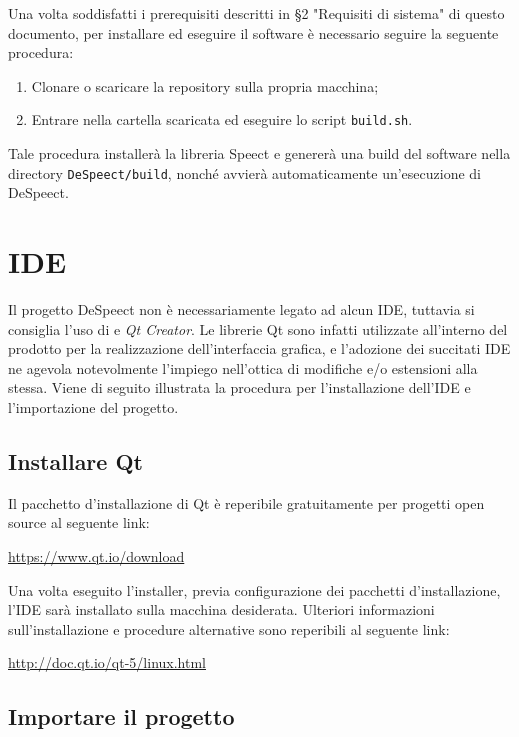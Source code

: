 \documentclass[openany,12pt,a4paper]{report}
\begin{document}
	\noindent Una volta soddisfatti i prerequisiti descritti in §2 "Requisiti di sistema" di questo documento, per installare ed eseguire il software è necessario seguire la seguente procedura:
	\begin{enumerate}
		\item Clonare o scaricare la repository sulla propria macchina;
		\item Entrare nella cartella scaricata ed eseguire lo script \verb|build.sh|.
	\end{enumerate}
	Tale procedura installerà la libreria Speect e genererà una build del software nella directory \verb|DeSpeect/build|, nonché avvierà automaticamente un'esecuzione di DeSpeect.
	
	\section{IDE}
	Il progetto DeSpeect non è necessariamente legato ad alcun \gls{IDE}, tuttavia si consiglia l'uso di  e \textit{Qt Creator}. Le librerie Qt sono infatti utilizzate all'interno del prodotto per la realizzazione dell'interfaccia grafica, e l'adozione dei succitati IDE ne agevola notevolmente l'impiego nell'ottica di modifiche e/o estensioni alla stessa. Viene di seguito illustrata la procedura per l'installazione dell'IDE e l'importazione del progetto.
	
	\subsection{Installare Qt}
	
	Il pacchetto d'installazione di Qt è reperibile gratuitamente per progetti open source al seguente link:
	\begin{center}
		\url{https://www.qt.io/download}
	\end{center}
	
	\noindent Una volta eseguito l'installer, previa configurazione dei pacchetti d'installazione, l'IDE sarà installato sulla macchina desiderata. Ulteriori informazioni sull'installazione e procedure alternative sono reperibili al seguente link:
	\begin{center}
		\url{http://doc.qt.io/qt-5/linux.html}
	\end{center} 
	
	\subsection{Importare il progetto}  
	
\end{document}
